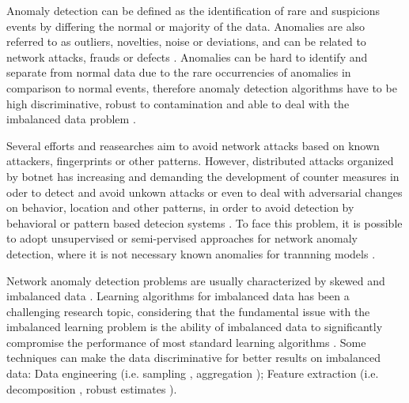 \documentclass[review]{elsarticle}
\begin{document}
Anomaly detection can be defined as the identification of rare and suspicions events by differing the normal or majority of the data. Anomalies are also referred to as outliers, novelties, noise or deviations, and can be related to network attacks, frauds or defects \cite{bhuyan2014network,ahmed2016survey}. Anomalies can be hard to identify and separate from normal data due to the rare occurrencies of anomalies in comparison to normal events, therefore anomaly detection algorithms have to be high discriminative, robust to contamination and able to deal with the imbalanced data problem \cite{he2008learning}.

Several efforts and reasearches aim to avoid network attacks based on known attackers, fingerprints or other patterns. However, distributed attacks organized by botnet has increasing and demanding the development of counter measures in oder to detect and avoid unkown attacks or even to deal with adversarial changes on behavior, location and other patterns, in order to avoid detection by behavioral or pattern based detecion systems \cite{gu2008botminer, garcia2014empirical,khattak2015botflex,acarali2016survey,wang2017botnet,Wang2018ddosbotnetssurvey}. To face this problem, it is possible to adopt unsupervised or semi-pervised approaches for network anomaly detection, where it is not necessary known anomalies for trannning models \cite{moustafa2019holistic}.

Network anomaly detection problems are usually characterized by skewed and imbalanced data \cite{Phua2004minority,he2008learning,benson2010network}. Learning algorithms for imbalanced data has been a challenging research topic, considering that the fundamental issue with the imbalanced learning problem is the ability of imbalanced data to significantly compromise the performance of most standard learning algorithms \cite{he2008learning}. Some techniques can make the data discriminative for better results on imbalanced data: Data engineering (i.e. sampling \cite{he2008learning,gu2008botminer}, aggregation \cite{lakhina2005mining,gu2008botminer,callegari2011novel, garcia2014empirical, acarali2016survey}); Feature extraction (i.e. decomposition \cite{vaswani2018robust}, robust estimates \cite{zhou2017anomaly}). 

\end{document}
